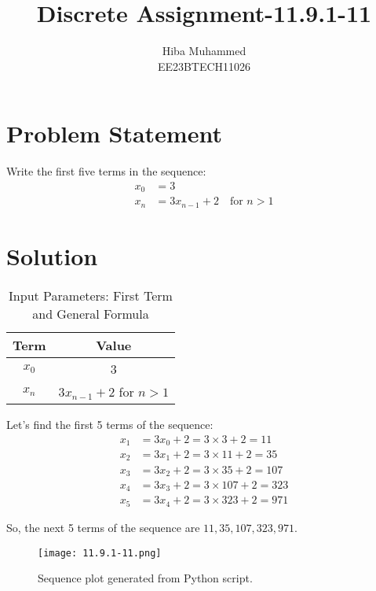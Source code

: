 \documentclass[12pt]{article}
\begin{document}
\title{Discrete Assignment-11.9.1-11}
\author{Hiba Muhammed \\
        EE23BTECH11026}
\maketitle

\section*{Problem Statement}
Write the first five terms in the sequence:
\[
\begin{aligned}
x_0 &= 3 \\
x_n &= 3x_{n-1} + 2 \quad \text{for } n > 1
\end{aligned}
\]

\section*{Solution}
\begin{table}[h]
  \centering
  \caption{Input Parameters: First Term and General Formula}
  \begin{tabular}{|c|c|}
    \hline
    \textbf{Term} & \textbf{Value} \\
    \hline
    \(x_0\) & 3 \\
    \(x_{n}\) & \(3x_{n-1} + 2\) for \(n > 1\) \\
    \hline
  \end{tabular}
\end{table}
Let's find the first 5 terms of the sequence:
\begin{align}
x_1 &= 3x_0 + 2 = 3 \times 3 + 2 = 11 \\x_2 &= 3x_1 + 2 = 3 \times 11 + 2 = 35 \\
x_3 &= 3x_2 + 2 = 3 \times 35 + 2 = 107 \\x_4 &= 3x_3 + 2 = 3 \times 107 + 2 = 323 \\
x_5 &= 3x_4 + 2 = 3 \times 323 + 2 = 971 
\end{align}

So, the next 5 terms of the sequence are \(11, 35, 107, 323, 971\).
\begin{figure}[h]
    \centering
    \texttt{[image: 11.9.1-11.png]}
    \caption{Sequence plot generated from Python script.}
    \label{fig:sequence-plot}
\end{figure}
\end{document}
